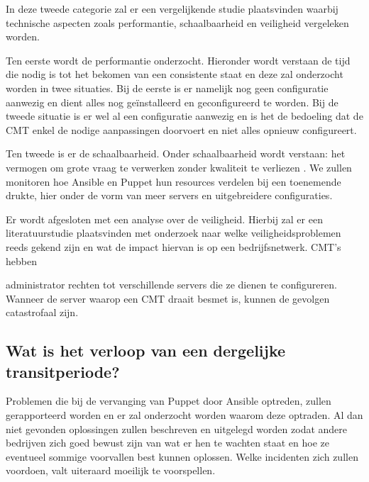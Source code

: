 In deze tweede categorie zal er een vergelijkende studie plaatsvinden waarbij technische aspecten zoals performantie, schaalbaarheid en veiligheid vergeleken worden. 
 
 Ten eerste wordt de performantie onderzocht. Hieronder wordt verstaan de tijd die nodig is tot het bekomen van een consistente staat en deze zal onderzocht worden in twee situaties. Bij de eerste is er namelijk nog geen configuratie aanwezig en dient alles nog ge\"installeerd en geconfigureerd te worden. Bij de tweede situatie is er wel al een configuratie aanwezig en is het de bedoeling dat de \gls{CMT} enkel de nodige aanpassingen doorvoert en niet alles opnieuw configureert. 

Ten tweede is er de schaalbaarheid. Onder schaalbaarheid wordt verstaan: het vermogen om grote vraag te verwerken zonder kwaliteit te verliezen \autocite{informit}. We zullen monitoren hoe Ansible en Puppet hun resources verdelen bij een toenemende drukte, hier onder de vorm van meer servers en uitgebreidere configuraties. 

Er wordt afgesloten met een analyse over de veiligheid. Hierbij zal er een literatuurstudie plaatsvinden met onderzoek naar welke veiligheidsproblemen reeds gekend zijn en wat de impact hiervan is op een bedrijfsnetwerk. \gls{CMT}'s hebben 






 administrator rechten tot verschillende servers die ze dienen te configureren. Wanneer de server waarop een \gls{CMT} draait besmet is, kunnen de gevolgen catastrofaal zijn.

\subsection{Wat is het verloop van een dergelijke transitperiode?}

Problemen die bij de vervanging van Puppet door Ansible optreden, zullen gerapporteerd worden en er zal onderzocht worden waarom deze optraden. Al dan niet gevonden oplossingen zullen beschreven en uitgelegd worden zodat andere bedrijven zich goed bewust zijn van wat er hen te wachten staat en hoe ze eventueel sommige voorvallen best kunnen oplossen. Welke incidenten zich zullen voordoen, valt uiteraard moeilijk te voorspellen. 




